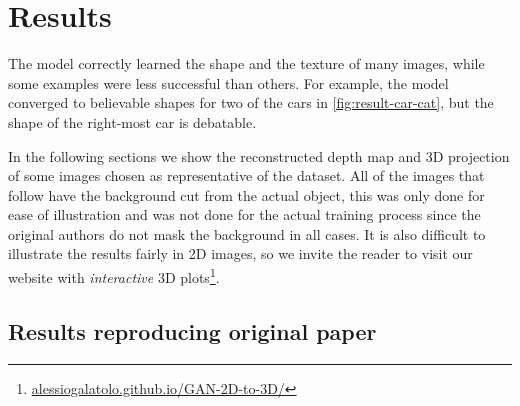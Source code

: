 \section{Results}
\label{sec:results}
The model correctly learned the shape and the texture of many images, while some examples were less successful than others. For example, the model converged to believable shapes for two of the cars in \autoref{fig:result-car-cat}, but the shape of the right-most car is debatable. 

In the following sections we show the reconstructed depth map and 3D projection of some images chosen as representative of the dataset. All of the images that follow have the background cut from the actual object, this was only done for ease of illustration and was not done for the actual training process since the original authors do not mask the background in all cases. It is also difficult to illustrate the results fairly in 2D images, so we invite the reader to visit our website %
with \textit{interactive} 3D plots\footnote{\href{https://alessiogalatolo.github.io/GAN-2D-to-3D/}{alessiogalatolo.github.io/GAN-2D-to-3D/}}.

\subsection{Results reproducing original paper}
\label{sec:replication}

